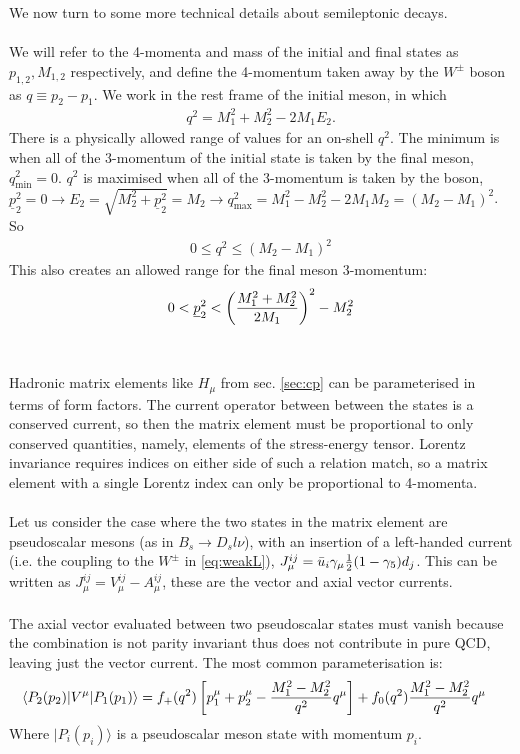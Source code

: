 We now turn to some more technical details about semileptonic decays.
\\ \\
We will refer to the 4-momenta and mass of the initial and final states as $p_{1,2},M_{1,2}$ respectively, and define the 4-momentum taken away by the $W^{\pm}$ boson as $q \equiv p_2 - p_1$. We work in the rest frame of the initial meson, in which
\begin{align}
	q^2 = M_1^2 + M_2^2 - 2M_1 E_2.
\end{align}
There is a physically allowed range of values for an on-shell $q^2$. The minimum is when all of the 3-momentum of the initial state is taken by the final meson, $q_{\text{min}} ^2 = 0$. $q^2$ is maximised when all of the 3-momentum is taken by the boson, $\underline{p}_2^2 = 0 \rightarrow E_2 = \sqrt{M_2^2 + \underline{p}_2^2 } = M_2 \rightarrow q_{\text{max}}^2 = M_1^2 - M_2^2 - 2M_1M_2 = ( M_2 - M_1 )^2$. So
\begin{align}
	0 \leq q^2 \leq ( M_2 - M_1 )^2
\end{align}
This also creates an allowed range for the final meson 3-momentum:
\begin{align}
	0 < \underline{p}_{2}^2 < \left( M_1^2 + M_2^2 \over 2M_1 \right)^2 - M_2^2
\end{align}
\\ \\
Hadronic matrix elements like $H_{\mu}$ from sec. \ref{sec:cp} can be parameterised in terms of form factors. The current operator between between the states is a conserved current, so then the matrix element must be proportional to only conserved quantities, namely, elements of the stress-energy tensor. Lorentz invariance requires indices on either side of such a relation match, so a matrix element with a single Lorentz index can only be proportional to 4-momenta.
\\ \\
Let us consider the case where the two states in the matrix element are pseudoscalar mesons (as in $B_s\to D_s l\nu$), with an insertion of a left-handed current (i.e. the coupling to the $W^{\pm}$ in \eqref{eq:weakL}), $J_{\mu}^{ij} = \bar{u}_i \gamma_{\mu} {1\over2}(1-\gamma_5) d_j$. This can be written as $J^{ij}_{\mu} = V^{ij}_{\mu} - A^{ij}_{\mu}$, these are the vector and axial vector currents. 
\\ \\
The axial vector evaluated between two pseudoscalar states must vanish because the combination is not parity invariant thus does not contribute in pure QCD, leaving just the vector current. The most common parameterisation is:
\begin{align}
\label{eq:formfactors}
\langle P_2 (p_2) | V^{\mu} | P_1 (p_1) \rangle  &= f_{+} (q^2) \left[ p_1^{\mu} + p_2^{\mu} - {M_1^2 - M_2^2 \over q^2} q^{\mu} \right] + f_0(q^2) {M_1^2 - M_2^2 \over q^2 } q^{\mu}
\end{align}
Where $|P_i(p_i)\rangle$ is a pseudoscalar meson state with momentum $p_i$.

